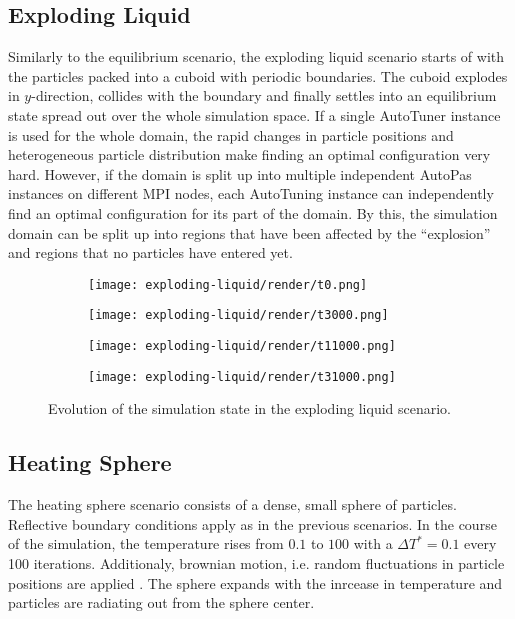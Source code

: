 \subsection{Exploding Liquid}
Similarly to the equilibrium scenario, the exploding liquid scenario starts of with the particles packed into a cuboid with periodic boundaries. The cuboid explodes in $y$-direction, collides with the boundary and finally settles into an equilibrium state spread out over the whole simulation space. If a single AutoTuner instance is used for the whole domain, the rapid changes in particle positions and heterogeneous particle distribution make finding an optimal configuration very hard. However, if the domain is split up into multiple independent AutoPas instances on different MPI nodes, each AutoTuning instance can independently find an optimal configuration for its part of the domain. By this, the simulation domain can be split up into regions that have been affected by the \enquote{explosion} and regions that no particles have entered yet.

\label{subsec:expl}
\begin{figure}[htpb]
	\centering
	\begin{subfigure}[c]{.25\textwidth}
		\vspace*{-\ht\colorbarbox} %
		\texttt{[image: exploding-liquid/render/t0.png]}
	\end{subfigure}%
	\begin{subfigure}[c]{.25\textwidth}
		\texttt{[image: exploding-liquid/render/t3000.png]}
	\end{subfigure}%
	\begin{subfigure}[c]{.25\textwidth}
		\centering
		\texttt{[image: exploding-liquid/render/t11000.png]}
	\end{subfigure}%
	\begin{subfigure}[c]{.25\textwidth}
		\centering
		\texttt{[image: exploding-liquid/render/t31000.png]}
	\end{subfigure}
	\label{fig:evolution_expl}
	\caption{Evolution of the simulation state in the exploding liquid scenario.}
\end{figure}

\subsection{Heating Sphere}
\label{subsec:hs}
The heating sphere scenario consists of a dense, small sphere of particles. Reflective boundary conditions apply as in the previous scenarios. In the course of the simulation, the temperature rises from $0.1$ to $100$ with a $\Delta \si{T^{*}}=0.1$ every 100 iterations. Additionaly, brownian motion, i.e. random fluctuations in particle positions are applied \cite{Moerters2010}. The sphere expands with the inrcease in temperature and particles are radiating out from the sphere center.

